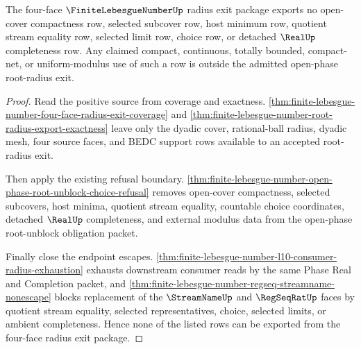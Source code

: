 \begin{theorem}
\label{thm:finite-lebesgue-number-four-face-radius-exit-nonescape}
The four-face $\FiniteLebesgueNumberUp$ radius exit package exports no open-cover compactness row, selected subcover row, host minimum row, quotient stream equality row, selected limit row, choice row, or detached $\RealUp$ completeness row. Any claimed compact, continuous, totally bounded, compact-net, or uniform-modulus use of such a row is outside the admitted open-phase root-radius exit.
\end{theorem}
\begin{proof}
Read the positive source from coverage and exactness. \autoref{thm:finite-lebesgue-number-four-face-radius-exit-coverage} and \autoref{thm:finite-lebesgue-number-root-radius-export-exactness} leave only the dyadic cover, rational-ball radius, dyadic mesh, four source faces, and BEDC support rows available to an accepted root-radius exit.

Then apply the existing refusal boundary. \autoref{thm:finite-lebesgue-number-open-phase-root-unblock-choice-refusal} removes open-cover compactness, selected subcovers, host minima, quotient stream equality, countable choice coordinates, detached $\RealUp$ completeness, and external modulus data from the open-phase root-unblock obligation packet.

Finally close the endpoint escapes. \autoref{thm:finite-lebesgue-number-l10-consumer-radius-exhaustion} exhausts downstream consumer reads by the same Phase Real and Completion packet, and \autoref{thm:finite-lebesgue-number-regseq-streamname-nonescape} blocks replacement of the $\StreamNameUp$ and $\RegSeqRatUp$ faces by quotient stream equality, selected representatives, choice, selected limits, or ambient completeness. Hence none of the listed rows can be exported from the four-face radius exit package.
\end{proof}
